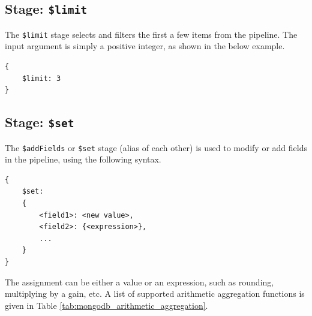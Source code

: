 \subsection{Stage: \texttt{\$limit}}

The \verb|$limit| stage selects and filters the first a few items from the pipeline. The input argument is simply a positive integer, as shown in the below example.
\begin{lstlisting}
{
	$limit: 3
}
\end{lstlisting}

\subsection{Stage: \texttt{\$set}}

The \verb|$addFields| or \verb|$set| stage (alias of each other) is used to modify or add fields in the pipeline, using the following syntax.
\begin{lstlisting}
{
	$set:
	{
		<field1>: <new value>,
		<field2>: {<expression>},
		...
	}
}
\end{lstlisting}
The assignment can be either a value or an expression, such as rounding, multiplying by a gain, etc. A list of supported arithmetic aggregation functions is given in Table \ref{tab:mongodb_arithmetic_aggregation}.

